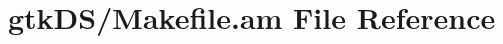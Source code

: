 \hypertarget{gtk_d_s_2_makefile_8am}{\section{gtk\+D\+S/\+Makefile.am File Reference}
\label{gtk_d_s_2_makefile_8am}
}
